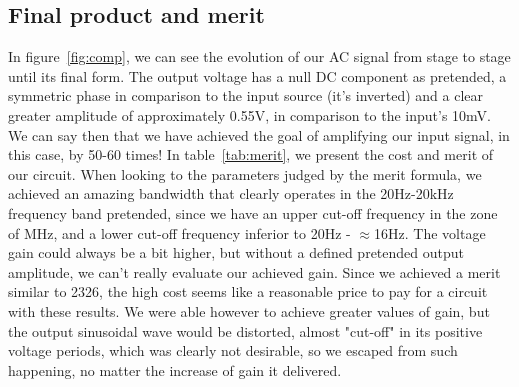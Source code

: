 \subsection{Final product and merit}
In figure~\ref{fig:comp}, we can see the evolution of our AC signal from stage to stage until its final form. The output voltage has a null DC component as pretended, a symmetric phase in comparison to the input source (it's inverted) and a clear greater amplitude of approximately 0.55V, in comparison to the input's 10mV. We can say then that we have achieved the goal of amplifying our input signal, in this case, by 50-60 times!
In table~\ref{tab:merit}, we present the cost and merit of our circuit. When looking to the parameters judged by the merit formula, we achieved an amazing bandwidth that clearly operates in the 20Hz-20kHz frequency band pretended, since we have an upper cut-off frequency in the zone of MHz, and a lower cut-off frequency inferior to 20Hz - $\approx$16Hz. The voltage gain could always be a bit higher, but without a defined pretended output amplitude, we can't really evaluate our achieved gain. Since we achieved a merit similar to 2326, the high cost seems like a reasonable price to pay for a circuit with these results. We were able however to achieve greater values of gain, but the output sinusoidal wave would be distorted, almost "cut-off" in its positive voltage periods, which was clearly not desirable, so we escaped from such happening, no matter the increase of gain it delivered.



\par
